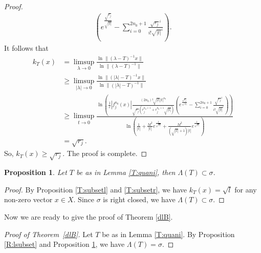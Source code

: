 \documentclass[12pt]{amsart}
\numberwithin{equation}{section}
\theoremstyle{plain}
\newtheorem{prop}[thm]{Proposition}
\theoremstyle{definition}
\begin{document}
\begin{proof}
\begin{align*}
\left(e^{\frac{\sqrt{r_j}}{\sqrt{|t|}}}-\sum_{i=0}^{2n_0+1}\frac{\sqrt{r_j}^i}{i!\sqrt{|t|}^{i}}\right).
\end{align*}
It follows that
\begin{align*}
k_{T}(x)
&=\limsup_{\lambda\rightarrow 0}
\frac{\ln\|(\lambda-T)^{-1}x\|}{\ln\|(\lambda-T)^{-1}\|}\\
&\geq\limsup_{|\lambda|\rightarrow 0}
\frac{\ln\|(|\lambda|-T)^{-1}x\|}{\ln\|(|\lambda|-T)^{-1}\|}\\
&\geq\limsup_{t\rightarrow 0}
\frac{\ln\left(\frac{1}{c}\left|f_{j}^{n_0}(x)\right|\frac{(2n_0)!\sqrt{|t|}|t|^{n_0}}{\sqrt{r_j}\left(r_j^{n_0+1}+r_j^{n_0+1}\sqrt{|t|}\right)}
\left(e^{\frac{\sqrt{r_j}}{\sqrt{|t|}}}-\sum_{i=0}^{2n_0+1}\frac{\sqrt{r_j}^i}{i!\sqrt{|t|}^{i}}\right)\right)}
{\ln\left(\frac{1}{|t|}+ \frac{M^2}{|t|}e^{\frac{1}{\sqrt{|t|}}}+
\frac{M^2}{(\sqrt{|t|}+1)|t|}e^{\frac{1}{\sqrt{|t|}}}\right)}\\
&=\sqrt{r_j}.
\end{align*}
So, $k_{T}(x)\geq \sqrt{r_j}$.
The proof is complete.
\end{proof}

\begin{prop}\label{Prop2}
Let $T$ be as in Lemma \ref{T:quani}, then
$\Lambda(T)\subset \sigma$.
\end{prop}

\begin{proof}
By Proposition \ref{T:subsetl} and \ref{T:subsetr}, we have $k_{T}(x)=\sqrt{l}$ for any non-zero vector $x\in X$.
Since $\sigma$ is right closed, we have $\Lambda(T)\subset \sigma$.
\end{proof}

Now we are ready to give the proof of Theorem \ref{dlB}.

\begin{proof}[Proof of Theorem~\ref{dlB}]
Let $T$ be as in Lemma \ref{T:quani}.
By Proposition \ref{R:lsubset} and Proposition \ref{Prop2}, we have $\Lambda(T)=\sigma$.
\end{proof}


\end{document}

